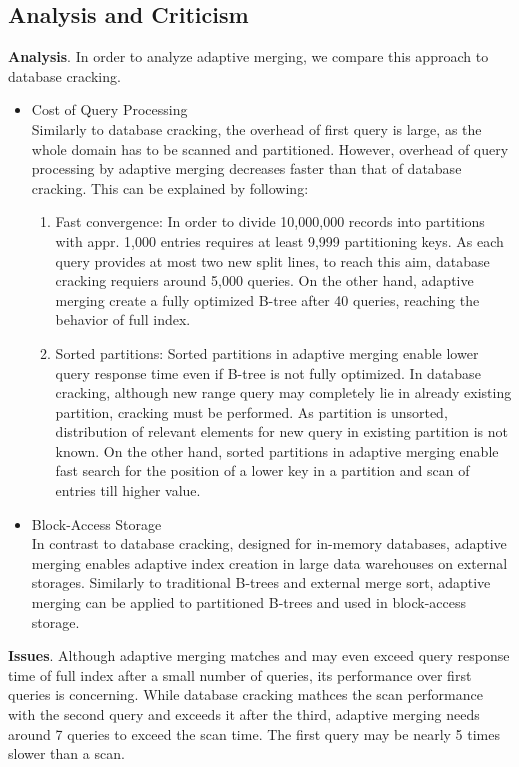 \documentclass[10pt, conference, compsocconf]{IEEEtran}
\begin{document}
\subsection{Analysis and Criticism}
\textbf{Analysis}. In order to analyze adaptive merging, we compare this approach to database cracking.\\
\begin{itemize}
\item{Cost of Query Processing} \\Similarly to database cracking, the overhead of first query is large, as the whole domain has to be scanned and partitioned. However, overhead of query processing by adaptive merging decreases faster than that of database cracking. This can be explained by following:\\
\begin{enumerate}
\item{Fast convergence}: In order to divide 10,000,000 records into partitions with appr. 1,000 entries requires at least 9,999 partitioning keys. As each query provides at most two new split lines, to reach this aim, database cracking requiers around 5,000 queries. On the other hand, adaptive merging create a fully optimized B-tree after 40 queries, reaching the behavior of full index.
\item{Sorted partitions}: Sorted partitions in adaptive merging enable lower query response time even if B-tree is not fully optimized. In database cracking, although new range query may completely lie in already existing partition, cracking must be performed. As partition is unsorted, distribution of relevant elements for new query in existing partition is not known. On the other hand, sorted partitions in adaptive merging enable fast search for the position of a lower key in a partition and scan of entries till higher value.\\
\end{enumerate}
\item{Block-Access Storage} \\ In contrast to database cracking, designed for in-memory databases, adaptive merging enables adaptive index creation in large data warehouses on external storages. Similarly to traditional B-trees and external merge sort, adaptive merging can be applied to partitioned B-trees and used in block-access storage. \\
\end{itemize}

\textbf{Issues}. Although adaptive merging matches and may even exceed query response time of full index after a small number of queries, its performance over first queries is concerning. While database cracking mathces the scan performance with the second query and exceeds it after the third, adaptive merging needs around 7 queries to exceed the scan time. The first query may be nearly 5 times slower than a scan.
\end{document}
